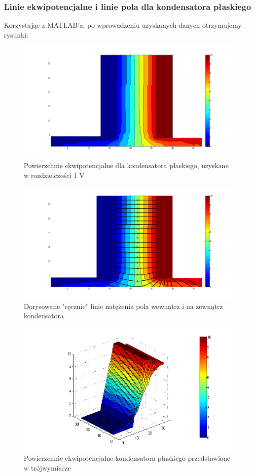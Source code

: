 \documentclass{article}
\begin{document}
\subsubsection{Linie ekwipotencjalne i linie pola dla kondensatora płaskiego}
Korzystając z MATLAB'a, po wprowadzeniu uzyskanych danych otrzymujemy rysunki:
\begin{figure}[h]
	\centering
	\includegraphics[scale=0.32]{plaskicontour}
	\caption{Powierzchnie ekwipotencjalne dla kondensatora płaskiego, uzyskane w rozdzielczości 1 V}
\end{figure}

\begin{figure}[h]
	\centering
	\includegraphics[scale=0.32]{plaskicontourLINIE}
	\caption{Dorysowane "ręcznie" linie natężenia pola wewnątrz i na zewnątrz kondensatora}
\end{figure}

\begin{figure}[h!]
	\centering
	\includegraphics[scale=0.45]{plaski3D}
	\caption{Powierzchnie ekwipotencjalne kondensatora płaskiego przedstawione w trójwymiarze}
\end{figure}
\end{document}

